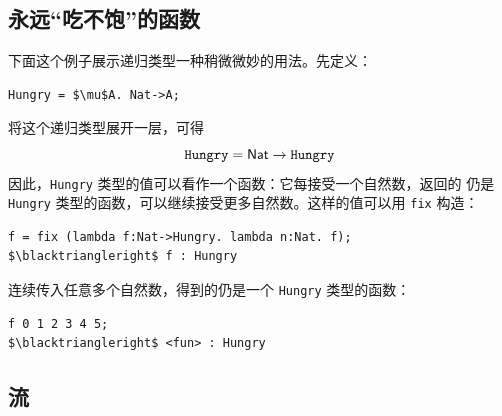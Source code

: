 \subsection*{永远“吃不饱”的函数}

下面这个例子展示递归类型一种稍微微妙的用法。先定义：
\begin{lstlisting}[mathescape=true]
Hungry = $\mu$A. Nat->A;
\end{lstlisting}
将这个递归类型展开一层，可得
\[
\texttt{Hungry}=\mathsf{Nat}\to\texttt{Hungry}
\]
因此，\texttt{Hungry} 类型的值可以看作一个函数：它每接受一个自然数，返回的
仍是 \texttt{Hungry} 类型的函数，可以继续接受更多自然数。这样的值可以用
\texttt{fix} 构造：
\begin{lstlisting}[mathescape=true]
f = fix (lambda f:Nat->Hungry. lambda n:Nat. f);
$\blacktriangleright$ f : Hungry
\end{lstlisting}

连续传入任意多个自然数，得到的仍是一个 \texttt{Hungry} 类型的函数：
\begin{lstlisting}[mathescape=true]
f 0 1 2 3 4 5;
$\blacktriangleright$ <fun> : Hungry
\end{lstlisting}


\subsection*{流}

